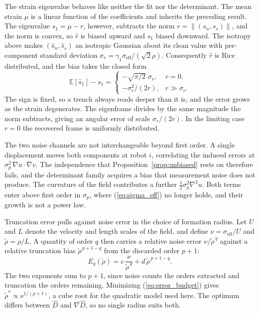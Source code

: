 \documentclass[lettersize,journal]{IEEEtran}
\begin{document}
The strain eigenvalue behaves like neither the fit nor the determinant.
The mean strain
$\mu$ is a linear function of the coefficients and inherits the
preceding result. The eigenvalue $s_1 = \mu - r$, however, subtracts the
norm $r = \lVert(s_n, s_s)\rVert$, and the norm is convex, so $\hat{r}$
is biased upward and $\hat{s}_1$ biased downward. The isotropy above
makes $(\hat{s}_n, \hat{s}_s)$ an isotropic Gaussian about its clean
value with per-component standard deviation $\sigma_r =
\gamma_1\sigma_{\mathrm{eff}}/(\sqrt{2}\rho)$. Consequently $\hat{r}$ is
Rice distributed, and the bias takes the closed form
\begin{equation}
    \mathbb{E}[\hat{s}_1] - s_1 =
    \begin{cases}
        -\sqrt{\pi/2}\;\sigma_r, & r = 0, \\[2pt]
        -\sigma_r^2 / (2r), & r \gg \sigma_r .
    \end{cases}
    \label{eq:s1_bias}
\end{equation}
The sign is fixed, so a trench always reads deeper than it is, and the
error grows as the strain degenerates. The eigenframe divides by the
same magnitude the norm subtracts, giving an angular error of scale
$\sigma_r/(2r)$. In the limiting case $r = 0$ the recovered frame is
uniformly distributed.

The two noise channels are not interchangeable beyond first order. A
single displacement moves both components at robot $i$, correlating the
induced errors at $\sigma_p^2\,\nabla u \cdot \nabla v$.
The independence that Proposition~\ref{prop:unbiased} rests on therefore
fails, and the determinant family acquires a bias that measurement noise
does not produce. The curvature of the field contributes a further
$\tfrac{1}{2}\sigma_p^2\nabla^2 u$. Both terms enter above first order
in $\sigma_p$, where (\ref{eq:sigma_eff}) no longer holds, and their
growth is not a power law.

Truncation error pulls against noise error in the choice of formation
radius. Let $U$ and $L$ denote the velocity and length scales of the
field, and define $\nu = \sigma_{\mathrm{eff}}/U$ and $\tilde{\rho} =
\rho/L$. A quantity of order $q$ then carries a relative noise error
$\nu/\tilde{\rho}^{\,q}$ against a relative truncation bias
$\tilde{\rho}^{\,p+1-q}$ from the discarded order $p+1$:
\begin{equation}
    E_q(\tilde{\rho}) = c\,\frac{\nu}{\tilde{\rho}^{\,q}}
        + d\,\tilde{\rho}^{\,p+1-q}.
    \label{eq:error_budget}
\end{equation}
The two exponents sum to $p+1$, since noise counts the orders extracted
and truncation the orders remaining. Minimizing
(\ref{eq:error_budget}) gives $\tilde{\rho}^* \propto \nu^{1/(p+1)}$, a
cube root for the
quadratic model used here. The optimum differs between $\hat{D}$ and
$\nabla\hat{D}$, so no single radius suits both.
\end{document}
